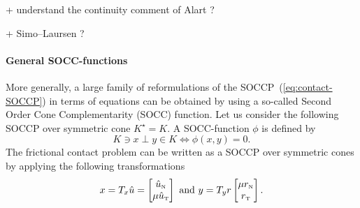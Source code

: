 \begin{ndrva}
  + understand the continuity comment of Alart ?

  + Simo--Laursen ?

\end{ndrva}



\paragraph{General SOCC-functions}

More generally, a large family of reformulations of the SOCCP~(\ref{eq:contact-SOCCP}) in terms of equations can be obtained by using a so-called Second Order Cone Complementarity (SOCC) function. Let us consider the following SOCCP over symmetric cone $K^\star = K $. A SOCC-function $\phi$ is defined by
\begin{equation}
  \label{eq:SOCC-function}
  K \ni x \perp y \in K \Longleftrightarrow \phi(x,y)=0.
\end{equation}
The frictional contact problem can be written as a SOCCP over symmetric cones by applying the following transformations
\begin{equation}
  \label{eq:SOCC-function1}
  x = T_x \hat u =
  \begin{bmatrix}
    \hat u_\n \\
    \mu \hat u_{\t}
  \end{bmatrix}
  \text{ and }  y =T_y r
  \begin{bmatrix}
    \mu r_\n \\
    r_\t
  \end{bmatrix}.
\end{equation}

